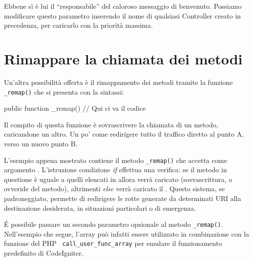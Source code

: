 
Ebbene sì è lui il ``responsabile'' del caloroso messaggio di benvenuto. Possiamo modificare questo parametro inserendo il nome di qualsiasi Controller creato in precedenza, per caricarlo con la priorità massima.

\section*{Rimappare la chiamata dei metodi}
Un'altra possibilità offerta è il rimappamento dei metodi tramite la funzione \verb|_remap()| che si presenta con la sintassi:

\begin{code}
public function _remap()
{
    // Qui ci va il codice
}
\end{code}

Il compito di questa funzione è sovrascrivere la chiamata di un metodo, caricandone un altro. Un po' come redirigere tutto il traffico diretto al punto A, verso un nuovo punto B.


L'esempio appena mostrato contiene il metodo \verb|_remap()| che accetta come argomento . L'istruzione condizione \emph{if} effettua una verifica: se il metodo in questione è uguale a quelli elencati in  allora verrà caricato  (sovrascrittura, o ovveride del metodo), altrimenti \emph{else} verrà caricato il . Questo sistema, se padroneggiato, permette di redirigere le rotte generate da determinati \ac{URI} alla destinazione desiderata, in situazioni particolari o di emergenza.

\'E possibile passare un secondo parametro opzionale al metodo \verb|_remap()|. Nell'esempio che segue, l'array può infatti essere utilizzato in combinazione con la funzione del \ac{PHP} \verb| call_user_func_array| per emulare il funzionamento predefinito di CodeIgniter.


